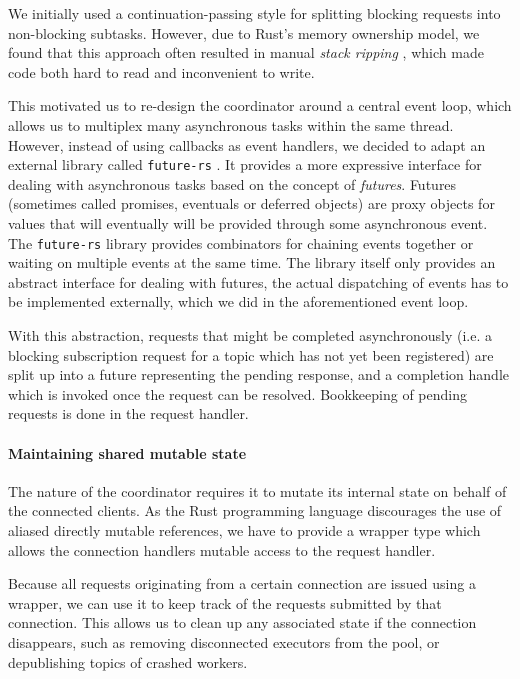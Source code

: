 We initially used a continuation-passing style for splitting blocking requests into
non-blocking subtasks. However, due to Rust's memory ownership model, we found that
this approach often resulted in manual \emph{stack ripping} \cite{stackmgmt},
which made code both hard to read and inconvenient to write.

This motivated us to re-design the coordinator around a central event loop, which
allows us to multiplex many asynchronous tasks within the same thread. However,
instead of using callbacks as event handlers, we decided to adapt an external
library called \lstinline{future-rs} \cite{futuresrs}. It provides a more expressive interface
for dealing with asynchronous tasks based on the concept of \emph{futures}. Futures
(sometimes called promises, eventuals or deferred objects) are proxy objects for
values that will eventually will be provided through some asynchronous event.
The \lstinline{future-rs} library provides combinators for chaining events
together or waiting on multiple events at the same time. The library itself
only provides an abstract interface for dealing with futures, the actual
dispatching of events has to be implemented externally, which we did in the
aforementioned event loop.

With this abstraction, requests that might be completed asynchronously
(i.e. a blocking subscription request for a topic which has not yet been registered)
are split up into a future representing the pending response, and a completion handle
which is invoked once the request can be resolved. Bookkeeping of pending requests
is done in the request handler.

\paragraph{Maintaining shared mutable state}

The nature of the coordinator requires it to mutate its internal state on
behalf of the connected clients. As the Rust programming language discourages
the use of aliased directly mutable references, we have to provide a wrapper
type which allows the connection handlers mutable access to the request handler.

Because all requests originating from a certain connection are issued using a
wrapper, we can use it to keep track of the requests submitted by that connection.
This allows us to clean up any associated state if the connection disappears,
such as removing disconnected executors from the pool, or depublishing 
topics of crashed workers.

